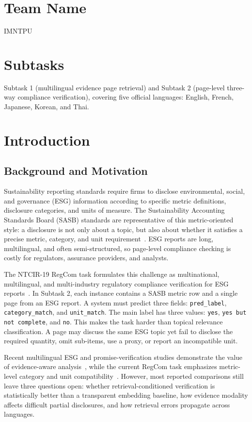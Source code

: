 \documentclass[sigconf,article]{acmart}
\begin{document}
\section*{Team Name}
IMNTPU

\section*{Subtasks}
Subtask 1 (multilingual evidence page retrieval) and Subtask 2 (page-level three-way compliance verification), covering five official languages: English, French, Japanese, Korean, and Thai.

\section{Introduction}
\subsection{Background and Motivation}
Sustainability reporting standards require firms to disclose environmental, social, and governance (ESG) information according to specific metric definitions, disclosure categories, and units of measure. The Sustainability Accounting Standards Board (SASB) standards are representative of this metric-oriented style: a disclosure is not only about a topic, but also about whether it satisfies a precise metric, category, and unit requirement~\cite{sasb2023standards}. ESG reports are long, multilingual, and often semi-structured, so page-level compliance checking is costly for regulators, assurance providers, and analysts.

The NTCIR-19 RegCom task formulates this challenge as multinational, multilingual, and multi-industry regulatory compliance verification for ESG reports~\cite{seki2026overview,ntcir19regcom}. In Subtask 2, each instance contains a SASB metric row and a single page from an ESG report. A system must predict three fields: \texttt{pred\_label}, \texttt{category\_match}, and \texttt{unit\_match}. The main label has three values: \texttt{yes}, \texttt{yes but not complete}, and \texttt{no}. This makes the task harder than topical relevance classification. A page may discuss the same ESG topic yet fail to disclose the required quantity, omit sub-items, use a proxy, or report an incompatible unit.

Recent multilingual ESG and promise-verification studies demonstrate the value of evidence-aware analysis~\cite{seki2025mlpromise,chen2025semeval,schmoll2025automated}, while the current RegCom task emphasizes metric-level category and unit compatibility~\cite{seki2026overview}. However, most reported comparisons still leave three questions open: whether retrieval-conditioned verification is statistically better than a transparent embedding baseline, how evidence modality affects difficult partial disclosures, and how retrieval errors propagate across languages.
\end{document}
